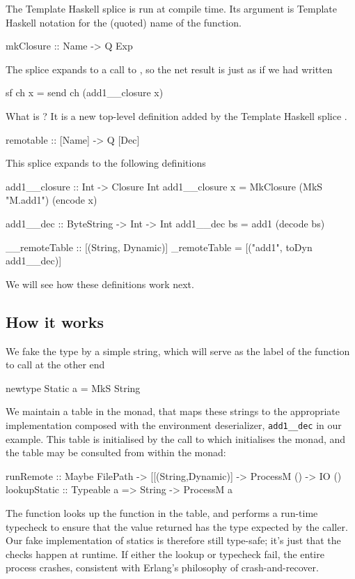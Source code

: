 \documentclass[preprint]{sigplanconf}
\begin{document}
The Template Haskell splice 
is run at compile time.  Its argument  is Template Haskell notation
for the (quoted) name of the  function.
\begin{code}
  mkClosure :: Name -> Q Exp
\end{code}
The splice expands to a call to , 
so the net result is just as if we had written
\begin{code}
  sf ch x = send ch (add1__closure x)
\end{code}
What is ?  It is a new top-level definition
added by the Template Haskell splice .
\begin{code}
  remotable :: [Name] -> Q [Dec]
\end{code}
This splice expands to the following definitions
\begin{code}
  add1__closure :: Int -> Closure Int
  add1__closure x = MkClosure (MkS "M.add1") (encode x)

  add1__dec :: ByteString -> Int -> Int
  add1__dec bs = add1 (decode bs)

  __remoteTable :: [(String, Dynamic)]
  _remoteTable = [("add1", toDyn add1__dec)]
\end{code}
We will see how these definitions work next.

\subsection{How it works}

We fake the  type by a simple string, which will serve as the 
label of the function to call at the other end
\begin{code}
  newtype Static a = MkS String
\end{code}
We maintain a table in the  monad, that maps these strings
to the appropriate implementation composed with the environment deserializer,
\texttt{add1\_\_dec} in our example.
This table is initialised by the call to  which initialises the
 monad, and the table may be consulted from within the monad:
\begin{code}
  runRemote    :: Maybe FilePath
               -> [[(String,Dynamic)]
               -> ProcessM () -> IO ()
  lookupStatic :: Typeable a => String -> ProcessM a
\end{code}
The  function looks up the function in the table,
and performs a run-time typecheck to ensure that the value returned
has the type expected by the caller.  Our fake implementation of
statics is therefore still type-safe; it's just that the checks happen
at runtime.  If either the lookup or typecheck fail, the entire 
process crashes, consistent with Erlang's philosophy of crash-and-recover.
\end{document}
